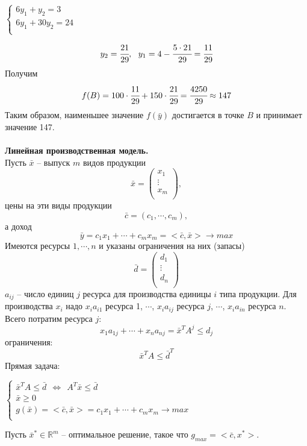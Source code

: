 \documentclass[12pt]{article}
\theoremstyle{definition}
\numberwithin{equation}{section}
\begin{document}
\begin{center}
$
\left\{
\begin{array}{lcl}
   6y_1+y_2=3\\
   6y_1+30y_2=24\\
\end{array}
\right.
$
\end{center}
$$y_2=\cfrac{21}{29},~~y_1=4-\cfrac{5\cdot 21}{29}=\cfrac{11}{29}$$
Получим
$$f(B)=100\cdot \cfrac{11}{29}+150\cdot \cfrac{21}{29}=\cfrac{4250}{29}\approx 147$$
Таким образом, наименьшее значение $f(\bar y)$ достигается в точке $B$ и принимает значение 147.\\
\\
\textbf{Линейная производственная модель.}\\
Пусть $\bar x$ -- выпуск $m$ видов продукции
\[\bar x=\begin{pmatrix}
x_1\\
\vdots\\
x_m\\
\end{pmatrix},\]
цены на эти виды продукции $$\bar c =(c_1, \cdots, c_m),$$
а доход $$\bar y=c_1x_1+\cdots +c_mx_m=<\bar c, \bar x> \to max$$
Имеются ресурсы $1, \cdots, n$ и указаны ограничения на них (запасы)
\[\bar d=\begin{pmatrix}
d_1\\
\vdots\\
d_n\\
\end{pmatrix}\]
$a_{ij}$ -- число единиц $j$ ресурса для производства единицы $i$ типа продукции. Для производства $x_i$ надо $x_ia_{i1}$ ресурса 1, $\cdots$, $x_ia_{ij}$ ресурса $j$, $\cdots$, $x_ia_{in}$ ресурса $n$.\\
Всего потратим ресурса $j$: $$x_1a_{1j}+\cdots+x_na_{nj}=\bar x^T A^j \leqslant d_j$$
ограничения: $$\bar x^TA\leqslant\bar d^T$$
Прямая задача:
\begin{center}
$
\left\{
\begin{array}{lcl}
   \bar x^TA\leqslant \bar d ~~\Leftrightarrow ~~A^T\bar x\leqslant \bar d\\
   \bar x \geqslant 0\\
   g(\bar x)=<\bar c, \bar x>=c_1x_1+\cdots+c_mx_m \to max\\
\end{array}
\right.
$
\end{center}
Пусть $\bar x^*\in \mathbb{R}^m$ -- оптимальное решение, такое что $g_{max}=<\bar c, x^*>$.\\
\end{document}
